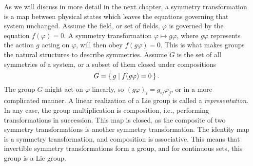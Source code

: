 As we will discuss in more detail in the next chapter, a symmetry transformation is a map between physical states which leaves the equations governing that system unchanged.
Assume the field, or set of fields, $\varphi$ is governed by the equation $f(\varphi) = 0$.
A symmetry transformation $\varphi \mapsto g \varphi$, where $g\varphi$ represents the action $g$ acting on $\varphi$, will then obey $f(g\varphi) = 0$.
This is what makes groups the natural structures to describe symmetries.
Assume $G$ is the set of all symmetries of a system, or a subset of them closed under compositions
%
\begin{equation}
    G = \left\{\, g \mid f(g\varphi) = 0 \,\right\}.
\end{equation}
%
The group $G$ might act on $\varphi$ linearly, so $(g\varphi)_i = g_{ij}\varphi_j$, or in a more complicated manner.
A linear realization of a Lie group is called a \emph{representation}.
In any case, the group multiplication is composition, i.e., performing transformations in succession.
This map is closed, as the composite of two symmetry transformations is another symmetry transformation.
The identity map is a symmetry transformation, and composition is associative.
This means that invertible symmetry transformations form a group, and for continuous sets, this group is a Lie group.

